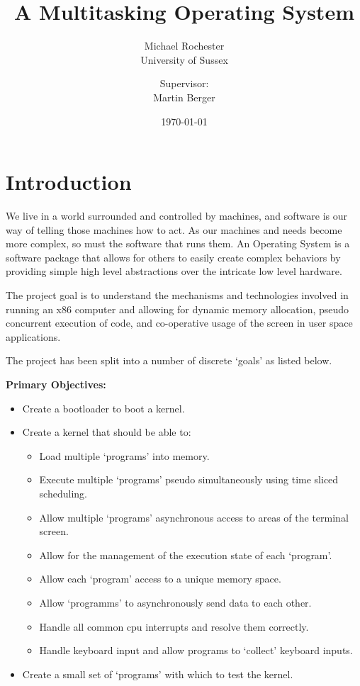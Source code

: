 \documentclass[a4paper]{report}
\title{A Multitasking Operating System}
\date{\today}
\author{Michael Rochester\\ University of Sussex
        \and Supervisor:\\ Martin Berger}
\begin{document}
\titlespacing*{\chapter}{0pt}{-50pt}{20pt}
\titleformat{\chapter}[display]{\normalfont\huge\bfseries}{\chaptertitlename\ \thechapter}{20pt}{\Huge}


\maketitle

\tableofcontents
\listoffigures

\chapter*{Introduction}
We live in a world surrounded and controlled by machines, and software is our way of telling those machines how to act. As our machines and needs become more complex, so must the software that runs them. An Operating System is a software package that allows for others to easily create complex behaviors by providing simple high level abstractions over the intricate low level hardware.

The project goal is to understand the mechanisms and technologies involved in running an x86 computer and allowing for dynamic memory allocation, pseudo concurrent execution of code, and co-operative usage of the screen in user space applications.

The project has been split into a number of discrete `goals' as listed below.


\textbf {Primary Objectives:}

\begin{itemize}
\item Create a bootloader to boot a kernel.
\item Create a kernel that should be able to:
\begin{itemize}
\item Load multiple `programs' into memory.
\item Execute multiple `programs' pseudo simultaneously using time sliced scheduling.
\item Allow multiple `programs' asynchronous access to areas of the terminal screen.
\item Allow for the management of the execution state of each `program'.
\item Allow each `program' access to a unique memory space.
\item Allow `programms' to asynchronously send data to each other.
\item Handle all common cpu interrupts and resolve them correctly.
\item Handle keyboard input and allow programs to `collect' keyboard inputs.
\end{itemize}
\item Create a small set of `programs' with which to test the kernel.
\end{itemize}
\end{document}
